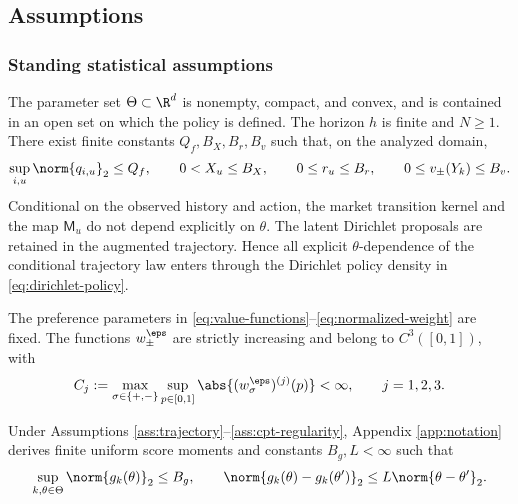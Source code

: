 \subsection{Assumptions}\label{sec:assumptions}

\subsubsection{Standing statistical assumptions}

\begin{assumption}\label{ass:trajectory}
The parameter set $\Theta\subset\R^d$ is nonempty, compact, and convex, and is contained in an open set on which the policy is defined.  The horizon $h$ is finite and $N\ge1$.  There exist finite constants $Q_f,B_X,B_r,B_v$ such that, on the analyzed domain,
\begin{equation}\label{eq:primitive-bounds}
 \sup_{i,u}\norm{q_{i,u}}_2\le Q_f,
 \qquad
 0<X_u\le B_X,
 \qquad
 0\le r_u\le B_r,
 \qquad
 0\le v_\pm(Y_k)\le B_v.
\end{equation}
Conditional on the observed history and action, the market transition kernel and the map $\mathsf M_u$ do not depend explicitly on $\theta$.  The latent Dirichlet proposals are retained in the augmented trajectory.  Hence all explicit $\theta$-dependence of the conditional trajectory law enters through the Dirichlet policy density in \eqref{eq:dirichlet-policy}.
\end{assumption}

\begin{assumption}\label{ass:cpt-regularity}
The preference parameters in \eqref{eq:value-functions}--\eqref{eq:normalized-weight} are fixed.  The functions $w_\pm^\eps$ are strictly increasing and belong to $C^3([0,1])$, with
\begin{equation}\label{eq:weight-derivative-bounds}
 C_j:=\max_{\sigma\in\{+,-\}}\sup_{p\in[0,1]}
 \abs{(w_\sigma^\eps)^{(j)}(p)}<\infty,
 \qquad j=1,2,3.
\end{equation}
\end{assumption}

Under Assumptions \ref{ass:trajectory}--\ref{ass:cpt-regularity}, Appendix \ref{app:notation} derives finite uniform score moments and constants $B_g,L<\infty$ such that
\begin{equation}\label{eq:gradient-smoothness-summary}
 \sup_{k,\theta\in\Theta}\norm{g_k(\theta)}_2\le B_g,
 \qquad
 \norm{g_k(\theta)-g_k(\theta')}_2\le L\norm{\theta-\theta'}_2.
\end{equation}

